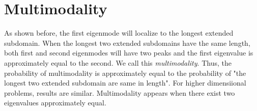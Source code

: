 \documentclass[a4paper,11pt]{article}
\begin{document}
%
%
%
%
%
%
%

\section{Multimodality}\label{multimodality}

As shown before, the first eigenmode will localize to the longest extended subdomain. When the longest two extended subdomains have the same length, both first and second eigenmodes will have two peaks and the first eigenvalue is approximately equal to the second. We call this \emph{multimodality}. Thus, the probability of multimodality is approximately equal to the probability of "the longest two extended subdomain are same in length". For higher dimensiional problems, results are similar. Multimodality appears when there exist two eigenvalues approximately equal.
\end{document}
